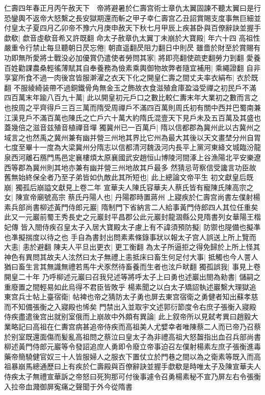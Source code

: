 仁壽四年春正月丙午赦天下　帝將避暑於仁壽宫術士章仇太翼固諫不聽太翼曰是行恐鑾輿不返帝大怒繫之長安獄期還而斬之甲子幸仁壽宫乙丑詔賞賜支度事無巨細並付皇太子夏四月乙卯帝不豫六月庚申赦天下秋七月甲辰上疾甚卧與百僚辭訣並握手歔欷|{
	歔音虛欷音希又許既翻}
命太子赦章仇太翼丁未崩於大寶殿|{
	年六十四}
高祖性嚴重令行禁止每旦聽朝日昃忘倦|{
	朝直遥翻昃阻力翻日中則昃}
雖嗇於財至於賞賜有功即無所愛將士戰没必加優賞仍遣使者勞問其家|{
	將即亮翻使疏吏翻勞力到翻}
愛養百姓勸課農桑輕徭薄賦其自奉養務為儉素乘輿御物故弊者隨宜補用|{
	乘繩證翻}
自非享宴所食不過一肉後宫皆服澣濯之衣天下化之開皇仁壽之間丈夫率衣絹布|{
	衣於既翻}
不服綾綺装帶不過銅鐵骨角無金玉之飾故衣食滋殖倉庫盈溢受禪之初民戶不滿四百萬末年踰八百九十萬|{
	此以開皇初元戶口之數比較仁夀末年大業初之數而言之也按周之平齊得戶三百三萬而隋受周禪戶不滿四百萬則周氏初有關中西并巴蜀南兼江漢見戶不滿百萬也陳氏之亡戶六十萬大約隋氏混壹天下見戶未及五百萬及其盛也蓋幾倍之滋音兹殖音植禪音墠}
獨冀州已一百萬戶|{
	隋以信都郡為冀州此以古冀州之域言之也然禹之冀州兼有幽并營三州地其界比它州為最大其後以天文畫埜分州自胃七度至畢十一度為大梁冀州分隋志以信都清河魏汲河内長平上黨河東絳文城臨汾龍泉西河離石鴈門馬邑定襄樓煩太原襄國武安趙恒山博陵河間涿上谷漁陽北平安樂遼西等郡為冀州則其地亦兼有幽并營三州地故其戶最多}
然猜忌苛察信受讒言功臣故舊無始終保全者乃至子弟皆如仇敵此其所短也|{
	此上總論文帝平生}
初文獻皇后既崩|{
	獨孤后崩謚文獻見上卷二年}
宣華夫人陳氏容華夫人蔡氏皆有寵陳氏陳高宗之女|{
	陳宣帝廟號高宗}
蔡氏丹陽人也|{
	丹陽郡時置蔣州}
上寢疾於仁壽宫尚書左僕射楊素兵部尚書柳述黃門侍郎元巖|{
	隋制門下省納言二人給事黃門侍郎四人其位任重矣此又一元巖前蜀王秀長史之元巖封平昌郡公此元巖封龍涸縣公見隋書列女華陽王楷妃傳}
皆入閤侍疾召皇太子入居大寶殿太子慮上有不諱須預防擬|{
	防禦也隄備也擬凖也凖擬揣度以待之也}
手自為書封出問素素條錄事狀以報太子宫人誤送上所上覽而大恚|{
	恚於避翻}
陳夫人平旦出更衣|{
	更工衡翻}
為太子所逼拒之得免歸於上所上怪其神色有異問其故夫人泫然曰太子無禮上恚抵床曰畜生何足付大事|{
	抵觸也今人詈人猶曰畜生言其無識無禮若馬牛犬豕然待畜養而生者也泫戶畎翻}
獨孤誤我|{
	事見上卷開皇二十年}
乃呼柳述元巖曰召我兒述等將呼太子上曰勇也述巖出閤為勑書|{
	儲嗣之重廢置之間輕易如此烏得不君臣皆敗乎}
楊素聞之以白太子矯詔執述巖繫大理獄追東宫兵士帖上臺宿衛|{
	帖裨也帝之猜防太子勇也屏去東宫宿衛之勇健者知出蘇孝慈而不知備張衡之入寢殿也悕矣}
門禁出入並取宇文述郭衍節度令右庶子張衡入寢殿侍疾盡遣後宫出就别室俄而上崩故中外頗有異論|{
	此上叙帝所以見弑考異曰趙毅大業略記曰高祖在仁夀宫病甚追帝侍疾而高祖美人尤嬖幸者唯陳蔡二人而已帝乃召蔡於别室既還面傷而髪亂高祖問之蔡泣曰皇太子為非禮高祖大怒齧指出血召兵部尚書柳述黃門侍郎元巖等令發詔追庶人勇即令廢立帝事迫召左僕射楊素左庶子張衡進毒藥帝簡驍健官奴三十人皆服婦人之服衣下置仗立於門巷之間以為之衛素等既入而高祖暴崩馬總通歷曰上有疾於仁壽殿與百僚辭訣並握手歔欷是時唯太子及陳宣華夫人侍疾太子無禮宣華訴之帝怒曰死狗那可付後事遽令召勇楊素秘不宣乃屏左右令張衡入拉帝血濺御屏寃痛之聲聞于外今從隋書}
